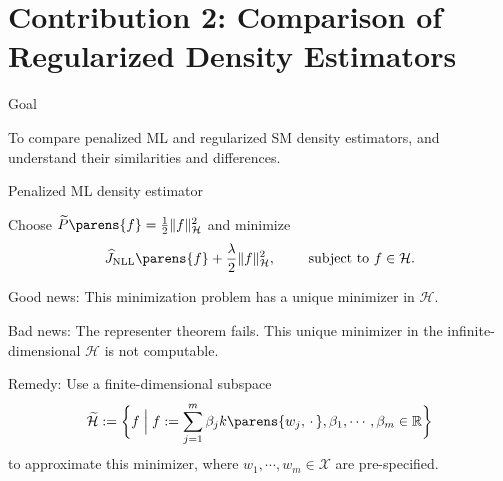 \documentclass[aspectratio=169,xcolor=dvipsnames]{beamer}
\newcommand{\NLL}{\mathrm{NLL}}
\newcommand{\calH}{\mathcal{H}}
\newcommand{\calX}{\mathcal{X}}
\begin{document}
\section{Contribution 2: Comparison of Regularized Density Estimators}

	
\begin{frame}{Goal}

	To compare penalized ML and regularized SM density estimators, and understand their similarities and differences. 
	
\end{frame}


\begin{frame}{Penalized ML density estimator}
	
	Choose $\widetilde{P} \parens{f} = \frac{1}{2} \Vert f \Vert_{\mathcal{H}}^2$ and minimize 
	\begin{align}
		\widehat{J}_{\NLL} \parens{f} + \frac{\lambda}{2} \Vert f \Vert_{\mathcal{H}}^2, \qquad \text{ subject to } f \in \mathcal{H}. 
	\end{align}
	
	{\color{defaultcolor}Good news:} This minimization problem has a unique minimizer in $\mathcal{H}$. 
	
	\vspace{10pt}
	
	{\color{defaultcolor}Bad news:} The representer theorem {\color{red}fails}. This unique minimizer in the infinite- dimensional $\mathcal{H}$ is {\color{red}not} computable. 
	
	\vspace{10pt}
	
	{\color{defaultcolor}Remedy:} Use a finite-dimensional subspace 
	\begin{align}
		\widetilde{\calH} := \bigg\{ f \Bigm| f := \sum_{j=1}^m \beta_j k \parens{w_j, \,\cdot\,}, \beta_1, \cdots, \beta_m \in \mathbb{R} \bigg\}
	\end{align}
	to approximate this minimizer, where $w_1, \cdots, w_m \in \calX$ are pre-specified. 
	
\end{frame}
\end{document}
